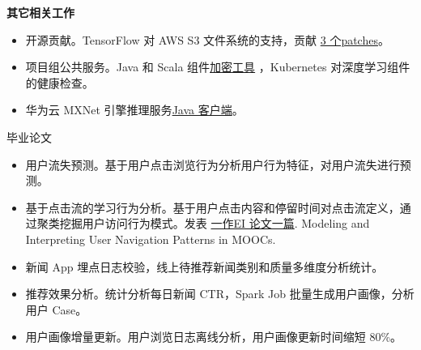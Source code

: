 \documentclass{resume}
\begin{document}
\begin{onehalfspacing}
\textbf{其它相关工作}  
\begin{itemize}%
  \item 开源贡献。TensorFlow 对 AWS S3 文件系统的支持，贡献 \href{https://github.com/tensorflow/tensorflow/pull/11089#issuecomment-320258536}{3 个patches}。
  \item 项目组公共服务。Java 和 Scala 组件\href{https://github.com/neuzxy/AESCryptTools}{加密工具} ，Kubernetes 对深度学习组件的健康检查。 
  \item 华为云 MXNet 引擎推理服务\href{https://github.com/huawei-clouds/dls-mxserving-client/tree/master/java}{Java 客户端}。
\end{itemize}
\end{onehalfspacing}

 {毕业论文}
\begin{itemize}[parsep=0.5ex]
  \item 用户流失预测。基于用户点击浏览行为分析用户行为特征，对用户流失进行预测。
  \item 基于点击流的学习行为分析。基于用户点击内容和停留时间对点击流定义，通过聚类挖掘用户访问行为模式。发表 \href{http://storage.cparty.co/user/02ct718cKf/activity/20161229092844J3VFZT9Q/publishnews/attachment_20170705055506001499234106971251_file}{一作EI 论文一篇}. Modeling and Interpreting User Navigation Patterns in MOOCs.
\end{itemize}


\begin{itemize}[parsep=0.5ex]
  \item 新闻 App 埋点日志校验，线上待推荐新闻类别和质量多维度分析统计。
  \item 推荐效果分析。统计分析每日新闻 CTR，Spark Job 批量生成用户画像，分析用户 Case。
  \item 用户画像增量更新。用户浏览日志离线分析，用户画像更新时间缩短 80\%。
\end{itemize}

\end{document}
